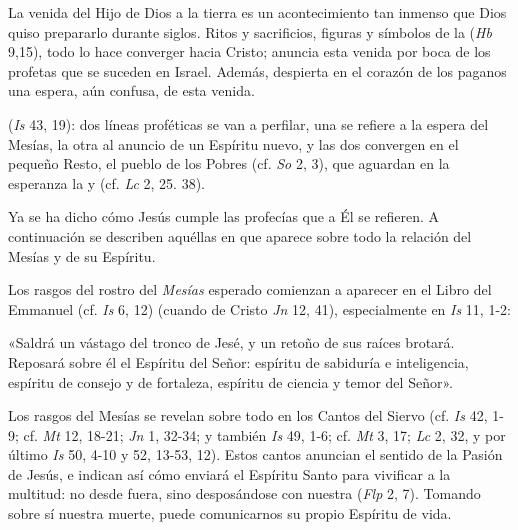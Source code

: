 

\begin{ccebody}
	
	
	 La venida del Hijo de Dios a la tierra es un acontecimiento tan inmenso que Dios quiso prepararlo durante siglos. Ritos y sacrificios, figuras y símbolos de la  (\emph{Hb} 9,15), todo lo hace converger hacia Cristo; anuncia esta venida por boca de los profetas que se suceden en Israel. Además, despierta en el corazón de los paganos una espera, aún confusa, de esta venida.
	
	
	  (\emph{Is} 43, 19): dos líneas proféticas se van a perfilar, una se refiere a la espera del Mesías, la otra al anuncio de un Espíritu nuevo, y las dos convergen en el pequeño Resto, el pueblo de los Pobres (cf. \emph{So} 2, 3), que aguardan en la esperanza la  y  (cf. \emph{Lc} 2, 25. 38).
	
	Ya se ha dicho cómo Jesús cumple las profecías que a Él se refieren. A continuación se describen aquéllas en que aparece sobre todo la relación del Mesías y de su Espíritu.
	
	 Los rasgos del rostro del \emph{Mesías} esperado comienzan a aparecer en el Libro del Emmanuel (cf. \emph{Is} 6, 12) (cuando  de Cristo \emph{Jn} 12, 41), especialmente en \emph{Is} 11, 1-2:
	
	«Saldrá un vástago del tronco de Jesé, y un retoño de sus raíces brotará. Reposará sobre él el Espíritu del Señor: espíritu de sabiduría e inteligencia, espíritu de consejo y de fortaleza, espíritu de ciencia y temor del Señor».
	
	 Los rasgos del Mesías se revelan sobre todo en los Cantos del Siervo (cf. \emph{Is} 42, 1-9; cf. \emph{Mt} 12, 18-21; \emph{Jn} 1, 32-34; y también \emph{Is} 49, 1-6; cf. \emph{Mt} 3, 17; \emph{Lc} 2, 32, y por último \emph{Is} 50, 4-10 y 52, 13-53, 12). Estos cantos anuncian el sentido de la Pasión de Jesús, e indican así cómo enviará el Espíritu Santo para vivificar a la multitud: no desde fuera, sino desposándose con nuestra  (\emph{Flp} 2, 7). Tomando sobre sí nuestra muerte, puede comunicarnos su propio Espíritu de vida.
	

\end{ccebody}
